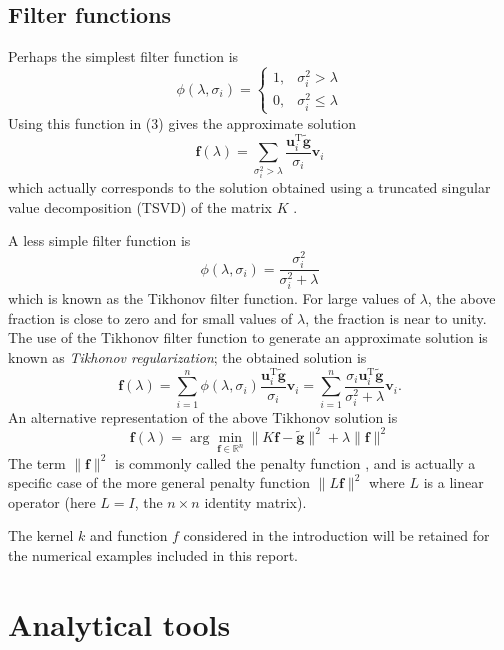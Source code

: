 \documentclass[12pt]{article}
\newcommand{\gnoise}{\widetilde{\mathbf{g}}}
\newcommand{\kmat}{K}	%
\newcommand{\fdis}{\mathbf{f}}
\newcommand{\trans}{\mathrm{T}}	%
\newcommand{\regparam}{\lambda}
\newcommand{\filt}{\phi}
\newcommand{\singular}{\sigma}	%
\newcommand{\LSV}{\mathbf{u}}	%
\newcommand{\RSV}{\mathbf{v}}	%
\begin{document}
\subsection{Filter functions} \label{Filer functions}
Perhaps the simplest filter function is
\[\filt(\regparam,\singular_i) = \begin{cases}
1, & \singular_i^2 > \regparam \\
0, & \singular_i^2 \leq \regparam
\end{cases}\]
Using this function in (3) gives the approximate solution
\[\fdis(\regparam) = \sum_{\singular_i^2 > \regparam} \frac{{\LSV^\trans_i}\gnoise}{\singular_i}\RSV_i\]
which actually corresponds to the solution obtained using a truncated singular value decomposition (TSVD) of the matrix $\kmat$ \cite{Vogel:2002}. \par
A less simple filter function is
\begin{equation}
\filt(\regparam,\singular_i)  = \frac{\singular_i^2}{\singular_i^2 + \regparam}
\label{Eq_TikFilt}
\end{equation}
which is known as the Tikhonov filter function. For large values of $\regparam$, the above fraction is close to zero and for small values of $\regparam$, the fraction is near to unity. The use of the Tikhonov filter function to generate an approximate solution is known as \textit{Tikhonov regularization}; the obtained solution is
\begin{equation}
\fdis(\regparam) = \sum_{i = 1}^n \filt(\regparam,\singular_i)\frac{{\LSV^\trans_i}\gnoise}{\singular_i}\RSV_i = \sum_{i = 1}^n \frac{\singular_i{\LSV^\trans_i}\gnoise}{\singular_i^2 + \regparam}\RSV_i.
\label{Eq_TikSol}
\end{equation}
An alternative representation of the above Tikhonov solution is
\begin{equation}
\fdis(\regparam) = \arg\min_{\fdis \in \mathbb{R}^n} \|\kmat\fdis - \gnoise\|^2 + \regparam\|\fdis\|^2
\end{equation}
The term $\|\fdis\|^2$ is commonly called the penalty function \cite{Vogel:2002}, and is actually a specific case of the more general penalty function $\|L\fdis\|^2$ where $L$ is a linear operator (here $L = I$, the $n \times n$ identity matrix).

The kernel $k$ and function $f$ considered in the introduction will be retained for the numerical examples included in this report.

\section{Analytical tools}
\end{document}
